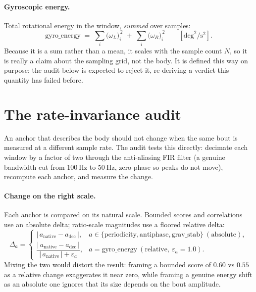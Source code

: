\documentclass[11pt]{article}
\newcommand{\Lvel}{\omega_{L}}          %
\newcommand{\Rvel}{\omega_{R}}          %
\begin{document}
\paragraph{Gyroscopic energy.} Total rotational energy in the window,
\emph{summed} over samples:
\begin{equation}
\text{gyro\_energy} \;=\; \sum_{i} \big(\Lvel\big)_i^{\,2} \;+\; \sum_{i} \big(\Rvel\big)_i^{\,2}
\qquad [\text{deg}^2/\text{s}^2].
\end{equation}
Because it is a sum rather than a mean, it scales with the sample count $N$, so it is
really a claim about the sampling grid, not the body. It is defined this way on purpose:
the audit below is expected to reject it, re-deriving a verdict this quantity has failed
before.

\section{The rate-invariance audit}
\label{sec:audit}

An anchor that describes the body should not change when the same bout is measured at a
different sample rate. The audit tests this directly: decimate each window by a factor of
two through the anti-aliasing FIR filter (a genuine bandwidth cut from
$100~\text{Hz}$ to $50~\text{Hz}$, zero-phase so peaks do not move), recompute each
anchor, and measure the change.

\paragraph{Change on the right scale.} Each anchor is compared on its natural scale.
Bounded scores and correlations use an absolute delta; ratio-scale magnitudes use a
floored relative delta:
\begin{equation}
\Delta_a =
\begin{cases}
\big|\,a_\text{native} - a_\text{dec}\,\big|, & a \in \{\text{periodicity}, \text{antiphase}, \text{grav\_stab}\}\ (\text{absolute}),\\[6pt]
\dfrac{\big|\,a_\text{native} - a_\text{dec}\,\big|}{\big|\,a_\text{native}\,\big| + \varepsilon_a}, & a = \text{gyro\_energy}\ (\text{relative},\ \varepsilon_a = 1.0).
\end{cases}
\end{equation}
Mixing the two would distort the result: framing a bounded score of $0.60$ vs $0.55$ as a
relative change exaggerates it near zero, while framing a genuine energy shift as an
absolute one ignores that its size depends on the bout amplitude.
\end{document}
